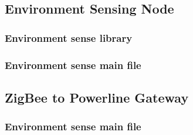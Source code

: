 \pagebreak

\subsection{Environment Sensing Node}
\label{an:environment-code}

\subsubsection{Environment sense library}



\subsubsection{Environment sense main file}


\pagebreak

\subsection{ZigBee to Powerline Gateway}
\label{an:gateway-code}

\subsubsection{Environment sense main file}


\pagebreak







